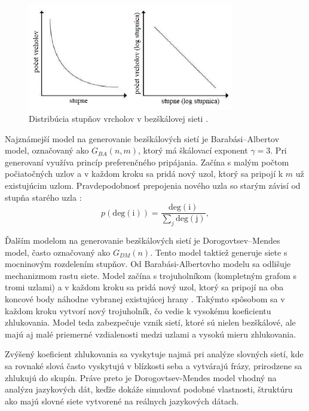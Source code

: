 \begin{figure}
    \centerline{\includegraphics[width=0.8\textwidth]{images/powerlaw.png}}
    \caption[Distribúcia stupňov vrcholov v bezškálovej sieti.]{Distribúcia stupňov vrcholov v bezškálovej sieti \cite{inproceedings} .}
    \label{obr:powerlaw}
\end{figure}

Najznámejší model na generovanie bezškálových sietí je Barabási–Albertov model, označovaný ako $G_{BA}(n, m)$, ktorý má
škálovací exponent $\gamma = 3$. Pri generovaní využíva princíp preferenčného pripájania. Začína s malým počtom počiatočných uzlov a v každom kroku sa pridá nový uzol,
ktorý sa pripojí k $m$ už existujúcim uzlom. Pravdepodobnosť prepojenia nového uzla so starým závisí od stupňa starého uzla \cite{barabasi2016network} :
\begin{equation}
    p(\mathrm{deg(i)}) = \frac{\mathrm{deg(i)}}{\sum_j \mathrm{deg(j)}},
    \label{eq:preferential_attachment}
\end{equation}

Ďalším modelom na generovanie bezškálových sietí je Dorogovtsev–Mendes model, často označovaný ako $G_{DM}(n)$.
Tento model taktiež generuje siete s mocninovým rozdelením stupňov. Od Barabási-Albertovho modelu sa odlišuje mechanizmom rastu siete.
Model začína s trojuholníkom (kompletným grafom s tromi uzlami) a v každom kroku sa pridá nový uzol, ktorý sa pripojí na oba koncové body
náhodne vybranej existujúcej hrany \cite{dorogovtsev2002evolution}. Takýmto spôsobom sa v každom kroku vytvorí nový trojuholník, čo vedie k
vysokému koeficientu zhlukovania. Model teda zabezpečuje vznik sietí, ktoré sú nielen bezškálové, ale majú aj malé
priemerné vzdialenosti medzi uzlami a vysokú mieru zhlukovania.

Zvýšený koeficient zhlukovania sa vyskytuje najmä pri analýze slovných sietí, kde sa rovnaké slová často vyskytujú v blízkosti seba a vytvárajú frázy,
prirodzene sa zhlukujú do skupín. Práve preto je Dorogovtsev-Mendes model vhodný na analýzu jazykových dát, keďže dokáže simulovať podobné vlastnosti, štruktúru
ako majú slovné siete vytvorené na reálnych jazykových dátach. 

